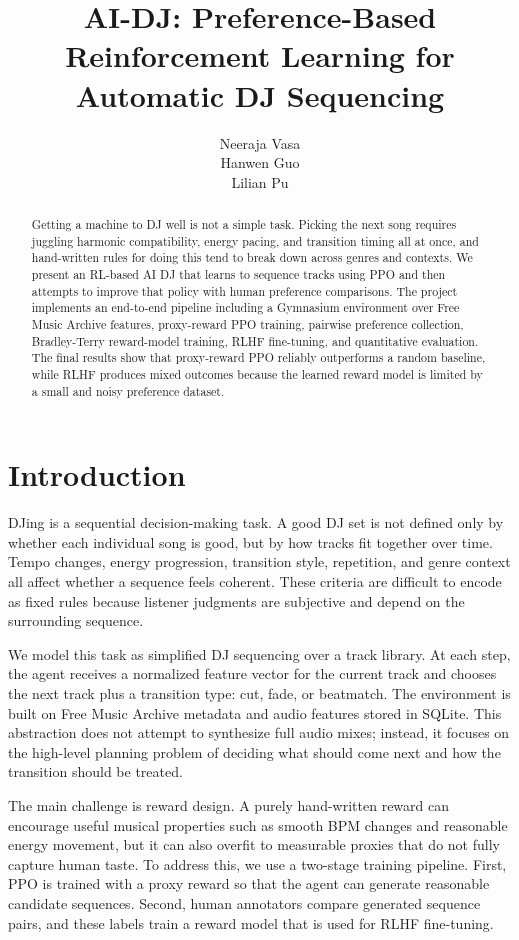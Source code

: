 \documentclass{article}
\title{AI-DJ: Preference-Based Reinforcement Learning for Automatic DJ Sequencing}
\author{
Neeraja Vasa \\
Hanwen Guo \\
Lilian Pu
}
\begin{document}
\maketitle

\begin{abstract}
Getting a machine to DJ well is not a simple task. Picking the next song requires juggling harmonic compatibility, energy pacing, and transition timing all at once, and hand-written rules for doing this tend to break down across genres and contexts. We present an RL-based AI DJ that learns to sequence tracks using PPO and then attempts to improve that policy with human preference comparisons. The project implements an end-to-end pipeline including a Gymnasium environment over Free Music Archive features, proxy-reward PPO training, pairwise preference collection, Bradley-Terry reward-model training, RLHF fine-tuning, and quantitative evaluation. The final results show that proxy-reward PPO reliably outperforms a random baseline, while RLHF produces mixed outcomes because the learned reward model is limited by a small and noisy preference dataset.
\end{abstract}

\section{Introduction}

DJing is a sequential decision-making task. A good DJ set is not defined only by whether each individual song is good, but by how tracks fit together over time. Tempo changes, energy progression, transition style, repetition, and genre context all affect whether a sequence feels coherent. These criteria are difficult to encode as fixed rules because listener judgments are subjective and depend on the surrounding sequence.

We model this task as simplified DJ sequencing over a track library. At each step, the agent receives a normalized feature vector for the current track and chooses the next track plus a transition type: cut, fade, or beatmatch. The environment is built on Free Music Archive metadata and audio features stored in SQLite. This abstraction does not attempt to synthesize full audio mixes; instead, it focuses on the high-level planning problem of deciding what should come next and how the transition should be treated.

The main challenge is reward design. A purely hand-written reward can encourage useful musical properties such as smooth BPM changes and reasonable energy movement, but it can also overfit to measurable proxies that do not fully capture human taste. To address this, we use a two-stage training pipeline. First, PPO is trained with a proxy reward so that the agent can generate reasonable candidate sequences. Second, human annotators compare generated sequence pairs, and these labels train a reward model that is used for RLHF fine-tuning.
\end{document}
